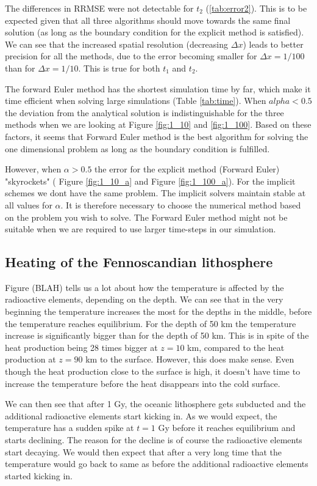 \documentclass{article}
\begin{document}
\begin{multicols}{2}
The differences in RRMSE were not detectable for $t_2$ (\ref{tab:error2}). This is to be expected given that all three algorithms should move towards the same final solution (as long as the boundary condition for the explicit method is satisfied). We can see that the increased spatial resolution (decreasing $\Delta x$) leads to better precision for all the methods, due to the error becoming smaller for $\Delta x=1/100$ than for $\Delta x = 1/10$. This is true for both $t_1$ and $t_2$. 

The forward Euler method has the shortest simulation time by far, which make it time efficient when solving large simulations (Table \ref{tab:time}). When $alpha<0.5$ the deviation from the analytical solution is indistinguishable for the three methods when we are looking at Figure \ref{fig:1_10} and \ref{fig:1_100}. Based on these factors, it seems that Forward Euler method is the best algorithm for solving the one dimensional problem as long as the boundary condition is fulfilled. 

However, when $\alpha>0.5$ the error for the explicit method (Forward Euler) "skyrockets" ( Figure \ref{fig:1_10_a} and Figure \ref{fig:1_100_a}). For the implicit schemes we dont have the same problem. The implicit solvers maintain stable at all values for $\alpha$. It is therefore necessary to choose the numerical method based on the problem you wish to solve. The Forward Euler method might not be suitable when we are required to use larger time-steps in our simulation. 

\subsection{Heating of the Fennoscandian lithosphere}

Figure (BLAH) tells us a lot about how the temperature is affected by the radioactive elements, depending on the depth. We can see that in the very beginning the temperature increases the most for the depths in the middle, before the temperature reaches equilibrium. For the depth of 50 km the temperature increase is significantly bigger than for the depth of 50 km. This is in spite of the heat production being 28 times bigger at $z=10$ km, compared to the heat production at $z=90$ km to the surface. However, this does make sense. Even though the heat production close to the surface is high, it doesn't have time to increase the temperature before the heat disappears into the cold surface. 

We can then see that after 1 Gy, the oceanic lithosphere gets subducted and the additional radioactive elements start kicking in. As we would expect, the temperature has a sudden spike at $t=1$ Gy before it reaches equilibrium and starts declining. The reason for the decline is of course the radioactive elements start decaying. We would then expect that after a very long time that the temperature would go back to same as before the additional radioactive elements started kicking in. 


\end{multicols}
\end{document}
